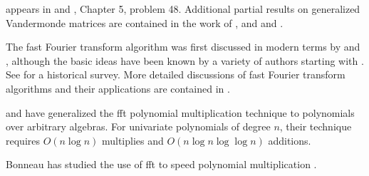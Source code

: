 \small

  appears
in {\Polya} and {\Szego} \cite{Polya:Szego}, Chapter 5, problem 48.
Additional partial results on generalized Vandermonde matrices are
contained in the work of {\MitchellO} \cite{Mitchell:Vandermonde}, and
{\EvansR} and {\Isaacs} \cite{Evans:Generalized:Vandermonde}.

The fast Fourier transform algorithm was first discussed in modern
terms by {\Cooley} and {\Tukey} \cite{Cooley65}, although the basic
ideas have been known by a variety of authors starting with {\Gauss}.
See \cite{Heideman84} for a historical survey.  More detailed
discussions of fast Fourier transform algorithms and their
applications are contained in 
\cite{Tolimieri89,Brigham88,VanLoan92,Pollard71}.

{\CantorD} and {\Kaltofen} \cite{Cantor91} have generalized the {\sc fft}
polynomial multiplication technique to polynomials over arbitrary
algebras.  For univariate polynomials of degree $n$, their technique
requires $O(n \log n)$ multiplies and $O(n \log n \log \log n)$
additions.

Bonneau has studied the use of {\sc fft} to speed polynomial
multiplication
\cite{Bonneau:Thesis}.

\normalsize
